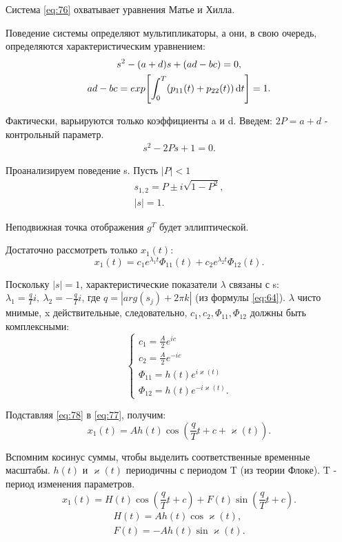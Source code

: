 Система \eqref{eq:76} охватывает уравнения Матье и Хилла. 

Поведение системы определяют мультипликаторы, а они, в свою очередь, определяются характеристическим уравнением:
\begin{gather*}
	s^2-(a+d)s+(ad-bc)=0, \\
	ad-bc=exp\qty[\int_0^T(p_{11}(t)+p_{22}(t))\dd{t}]=1.		
\end{gather*}

Фактически, варьируются только коэффициенты a и d. Введем: $2P=a+d$ - контрольный параметр.
\begin{gather*}
	s^2-2Ps+1=0.		
\end{gather*}

Проанализируем поведение s.
Пусть $|P|<1$
\begin{gather*}
	s_{1,2}=P\pm i\sqrt{1-P^2}, \\
	|s|=1.		
\end{gather*}

Неподвижная точка отображения $g^T$ будет эллиптической. 

Достаточно рассмотреть только $x_1(t)$:
\begin{equation}
	x_1(t)=c_1e^{\lambda_1 t}\Phi_{11}(t)+c_2e^{\lambda_2 t}\Phi_{12}(t).
	\label{eq:77}
\end{equation}

Поскольку $|s|=1$, характеристические показатели $\lambda$ связаны с s: $\lambda_1=\frac{q}{T}i,~\lambda_2=-\frac{q}{T}i$, где $q=|arg(s_j)+2\pi k|$ (из формулы \eqref{eq:64}). $\lambda$ чисто мнимые, x действительные, следовательно, $c_1, c_2, \Phi_{11}, \Phi_{12}$ должны быть комплексными:
\begin{equation}
	\left\{\begin{aligned}
		c_1=\frac{A}{2}e^{ic} \\
		c_2=\frac{A}{2}e^{-ic} \\
		\Phi_{11}=h(t)e^{i\varkappa(t)} \\
		\Phi_{12}=h(t)e^{-i\varkappa(t)}.
	\end{aligned}\right.
	\label{eq:78}
\end{equation}

Подставляя \eqref{eq:78} в \eqref{eq:77}, получим:
\begin{equation}
	x_1(t)=Ah(t)\cos (\frac{q}{T}t+c+\varkappa(t)).
	\label{eq:79}
\end{equation}

Вспомним косинус суммы, чтобы выделить соответственные временные масштабы. $h(t)$ и $\varkappa(t)$ периодичны с периодом T (из теории Флоке). T - период изменения параметров.
\begin{equation}
	x_1(t)=H(t)\cos{(\frac{q}{T}t+c)}+F(t)\sin{(\frac{q}{T}t+c)}.
	\label{eq:80}
\end{equation}
\begin{gather*}
	H(t)=Ah(t)\cos \varkappa(t), \\
	F(t)=-Ah(t)\sin \varkappa(t).		
\end{gather*}

